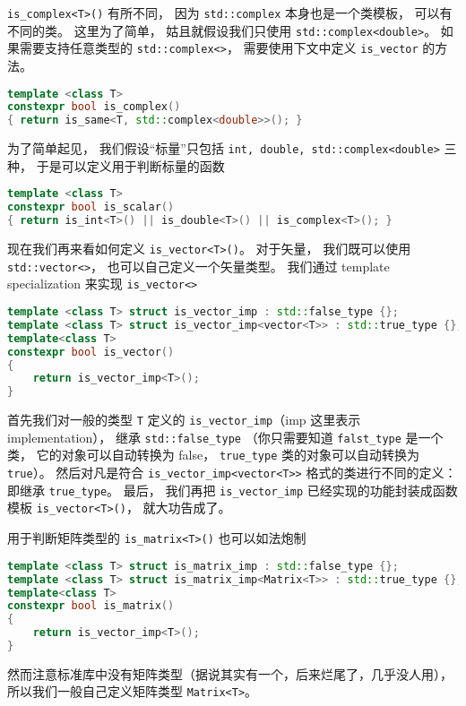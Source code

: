\verb|is_complex<T>()| 有所不同， 因为 \verb|std::complex| 本身也是一个类模板， 可以有不同的类。 这里为了简单， 姑且就假设我们只使用 \verb|std::complex<double>|。 如果需要支持任意类型的 \verb|std::complex<>|， 需要使用下文中定义 \verb|is_vector| 的方法。
\begin{lstlisting}[language=cpp]
template <class T>
constexpr bool is_complex()
{ return is_same<T, std::complex<double>>(); }
\end{lstlisting}

为了简单起见， 我们假设“标量”只包括 \verb|int, double, std::complex<double>| 三种， 于是可以定义用于判断标量的函数
\begin{lstlisting}[language=cpp]
template <class T>
constexpr bool is_scalar()
{ return is_int<T>() || is_double<T>() || is_complex<T>(); }
\end{lstlisting}

现在我们再来看如何定义 \verb|is_vector<T>()|。 对于矢量， 我们既可以使用 \verb|std::vector<>|， 也可以自己定义一个矢量类型。 我们通过 template specialization 来实现 \verb|is_vector<>|
\begin{lstlisting}[language=cpp]
template <class T> struct is_vector_imp : std::false_type {};
template <class T> struct is_vector_imp<vector<T>> : std::true_type {};
template<class T>
constexpr bool is_vector()
{
    return is_vector_imp<T>();
}
\end{lstlisting}

首先我们对一般的类型 \verb|T| 定义的 \verb|is_vector_imp|（imp 这里表示 implementation）， 继承 \verb|std::false_type| （你只需要知道 \verb|falst_type| 是一个类， 它的对象可以自动转换为 false， \verb|true_type| 类的对象可以自动转换为 \verb|true|）。 然后对凡是符合 \verb|is_vector_imp<vector<T>>| 格式的类进行不同的定义： 即继承 \verb|true_type|。 最后， 我们再把 \verb|is_vector_imp| 已经实现的功能封装成函数模板 \verb|is_vector<T>()|， 就大功告成了。

用于判断矩阵类型的 \verb|is_matrix<T>()| 也可以如法炮制
\begin{lstlisting}[language=cpp]
template <class T> struct is_matrix_imp : std::false_type {};
template <class T> struct is_matrix_imp<Matrix<T>> : std::true_type {};
template<class T>
constexpr bool is_matrix()
{
    return is_vector_imp<T>();
}
\end{lstlisting}
然而注意标准库中没有矩阵类型（据说其实有一个，后来烂尾了，几乎没人用）， 所以我们一般自己定义矩阵类型 \verb|Matrix<T>|。
